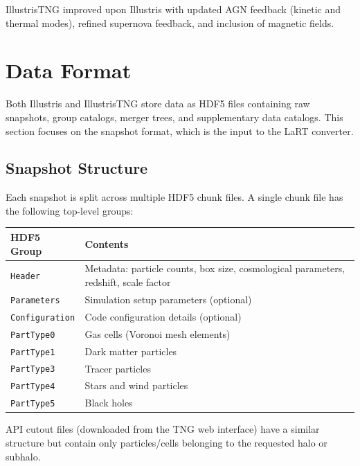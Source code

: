 \documentclass[english,a4paper]{my_memo}
\begin{document}
IllustrisTNG improved upon Illustris with updated AGN feedback (kinetic
and thermal modes), refined supernova feedback, and inclusion of
magnetic fields.

\section{Data Format}
\label{sec:format}

Both Illustris and IllustrisTNG store data as HDF5 files containing
raw snapshots, group catalogs, merger trees, and supplementary data
catalogs.  This section focuses on the snapshot format, which is the
input to the LaRT converter.

\subsection{Snapshot Structure}

Each snapshot is split across multiple HDF5 chunk files.  A single
chunk file has the following top-level groups:

\begin{center}
\begin{tabular}{lp{10cm}}
\toprule
\textbf{HDF5 Group} & \textbf{Contents} \\
\midrule
\texttt{Header}       & Metadata: particle counts, box size, cosmological parameters,
                        redshift, scale factor \\
\texttt{Parameters}   & Simulation setup parameters (optional) \\
\texttt{Configuration}& Code configuration details (optional) \\
\texttt{PartType0}    & Gas cells (Voronoi mesh elements) \\
\texttt{PartType1}    & Dark matter particles \\
\texttt{PartType3}    & Tracer particles \\
\texttt{PartType4}    & Stars and wind particles \\
\texttt{PartType5}    & Black holes \\
\bottomrule
\end{tabular}
\end{center}

API cutout files (downloaded from the TNG web interface) have a
similar structure but contain only particles/cells belonging to the
requested halo or subhalo.
\end{document}
